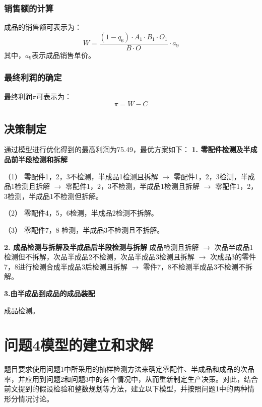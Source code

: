 \documentclass[withoutpreface,bwprint]{cumcmthesis} %
\begin{document}
\subsubsection{销售额的计算}
成品的销售额可表示为：
\begin{equation}
	W=\frac{\left(1-q_6\right) \cdot A_1 \cdot B_1 \cdot O_1}{B \cdot O} \cdot a_9
\end{equation}
其中，$a_9$表示成品销售单价。

\subsubsection{最终利润的确定}
最终利润$\pi$可表示为：
\begin{equation}
	\pi=W-C
\end{equation}

\subsection{决策制定}

通过模型进行优化得到的最高利润为75.49，最优方案如下：
\textbf{1. 零配件检测及半成品前半段检测和拆解}

（1） 零配件1，2，3不检测，半成品1检测且拆解 $\rightarrow$ 零配件1，2，3检测，半成品1检测且拆解 $\rightarrow$ 零配件1，2，3不检测，半成品1检测且拆解 $\rightarrow$ 零配件1，2，3检测，半成品1不检测但拆解。

（2） 零配件4，5，6检测，半成品2检测不拆解。

（3） 零配件7，8 检测，半成品3不检测且不拆解。

\textbf{2. 成品检测与拆解及半成品后半段检测与拆解}
成品检测且拆解 $\rightarrow$ 次品半成品1检测但不拆解，次品半成品2不检测，次品半成品3检测且拆解 $\rightarrow$ 
次成品3的零件7，8进行检测合成半成品3后检测且拆解 $\rightarrow$ 零件7，8不检测半成品3不检测不拆解。

\textbf{3.由半成品到成品的成品装配}

成品检测。



\section{问题4模型的建立和求解}

题目要求使用问题1中所采用的抽样检测方法来确定零配件、半成品和成品的次品率，并应用到问题2和问题3中的各个情况中，从而重新制定生产决策。对此，结合前文提到的假设检验和整数规划等方法，建立以下模型，并按照问题1中的两种情形分情况讨论。
\end{document}

